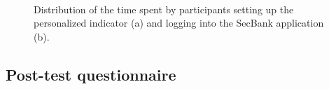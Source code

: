 \begin{figure}[!ht]
  \centering
   \\
  \caption[Distribution of the time spent by participants setting up the personalized indicator and logging into the SecBank application]{Distribution of the time spent by participants setting up the personalized indicator (a) and logging into the SecBank application (b).}
\end{figure}

\subsection{Post-test questionnaire}

